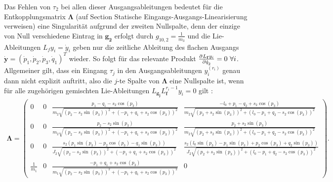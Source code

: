 Das Fehlen von $\tau_2$ bei allen dieser Ausgangsableitungen bedeutet für die Entkopplungsmatrix $\mathbf{\Lambda}$ (auf Section Statische Eingangs-Ausgangs-Linearisierung verweisen) eine Singularität aufgrund der zweiten Nullspalte, denn der einzige von Null verschiedene Eintrag in $\mathbf{g_2}$ erfolgt durch $g_{10, 2} = \frac{1}{m_3}$ und die Lie-Ableitungen $L_f y_i = \dot{y}_i$ geben nur die zeitliche Ableitung des flachen Ausgangs $\dot{\mathbf{y}} = (\dot{p}_1, \dot{p}_2, \dot{p}_3, \dot{q}_1)^T$ wieder. So folgt für das relevante Produkt $\partiell{L_{\mathbf{f}} y_i}{\dot{q}_2} = 0 \ \forall i$. Allgemeiner gilt, dass ein Eingang $\tau_j$ in den Ausgangsableitungen $y_i^{(r_i)}$ genau dann nicht explizit auftritt, also die $j$-te Spalte von $\mathbf{\Lambda}$ eine Nullspalte ist, wenn für alle zugehörigen gemischten Lie-Ableitungen $L_{\mathbf{g_j}} L_{\mathbf{f}}^{r_i-1} y_i = 0$ gilt \cite[S. 201]{NLRT_Roebenack}:
\begin{align}
	\mathbf{\Lambda} = 
	\left(\begin{matrix}
		0 & 0 & \frac{p_{1} - q_{1} - s_{2} \cos{\left(p_{3} \right)}}{m_{2} \sqrt{\left(p_{2} - s_{2} \sin{\left(p_{3} \right)}\right)^{2} + \left(- p_{1} + q_{1} + s_{2} \cos{\left(p_{3} \right)}\right)^{2}}} & \frac{- l_{0} + p_{1} - q_{2} + s_{2} \cos{\left(p_{3} \right)}}{m_{2} \sqrt{\left(p_{2} + s_{2} \sin{\left(p_{3} \right)}\right)^{2} + \left(l_{0} - p_{1} + q_{2} - s_{2} \cos{\left(p_{3} \right)}\right)^{2}}}\\
		0 & 0 & \frac{p_{2} - s_{2} \sin{\left(p_{3} \right)}}{m_{2} \sqrt{\left(p_{2} - s_{2} \sin{\left(p_{3} \right)}\right)^{2} + \left(- p_{1} + q_{1} + s_{2} \cos{\left(p_{3} \right)}\right)^{2}}} & \frac{p_{2} + s_{2} \sin{\left(p_{3} \right)}}{m_{2} \sqrt{\left(p_{2} + s_{2} \sin{\left(p_{3} \right)}\right)^{2} + \left(l_{0} - p_{1} + q_{2} - s_{2} \cos{\left(p_{3} \right)}\right)^{2}}}\\
		0 & 0 & \frac{s_{2} \left(p_{1} \sin{\left(p_{3} \right)} - p_{2} \cos{\left(p_{3} \right)} - q_{1} \sin{\left(p_{3} \right)}\right)}{J_{2} \sqrt{\left(p_{2} - s_{2} \sin{\left(p_{3} \right)}\right)^{2} + \left(- p_{1} + q_{1} + s_{2} \cos{\left(p_{3} \right)}\right)^{2}}} & \frac{s_{2} \left(l_{0} \sin{\left(p_{3} \right)} - p_{1} \sin{\left(p_{3} \right)} + p_{2} \cos{\left(p_{3} \right)} + q_{2} \sin{\left(p_{3} \right)}\right)}{J_{2} \sqrt{\left(p_{2} + s_{2} \sin{\left(p_{3} \right)}\right)^{2} + \left(l_{0} - p_{1} + q_{2} - s_{2} \cos{\left(p_{3} \right)}\right)^{2}}}\\
		\frac{1}{m_{1}} & 0 & \frac{- p_{1} + q_{1} + s_{2} \cos{\left(p_{3} \right)}}{m_{1} \sqrt{\left(p_{2} - s_{2} \sin{\left(p_{3} \right)}\right)^{2} + \left(- p_{1} + q_{1} + s_{2} \cos{\left(p_{3} \right)}\right)^{2}}} & 0
	\end{matrix}\right) .
\end{align}

